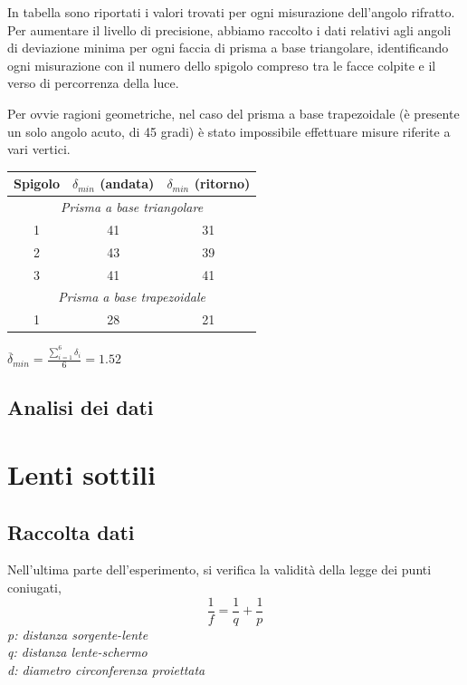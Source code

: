 \documentclass[a4paper,10pt]{report}
\begin{document}
In tabella sono riportati i valori trovati per ogni misurazione dell'angolo rifratto. Per aumentare il livello di precisione, abbiamo raccolto i dati relativi agli angoli di deviazione minima per ogni faccia di prisma a base triangolare, identificando ogni misurazione con il numero dello spigolo compreso tra le facce colpite e il verso di percorrenza della luce.

Per ovvie ragioni geometriche, nel caso del prisma a base trapezoidale (è presente un solo angolo acuto, di 45 gradi) è stato impossibile effettuare misure riferite a vari vertici.

\begin{table}
\center
\renewcommand{\arraystretch}{1.2}
\begin{tabular}{|c | c | c|}
\hline
Spigolo & $\delta_{min}$ (andata) & $\delta_{min}$ (ritorno)\\
\hline
\multicolumn{3}{|c|}{\textit{Prisma a base triangolare}} \\
\hline
1 & 41 & 31\\
2 & 43 & 39\\
3 & 41 & 41\\
\hline
\multicolumn{3}{|c|}{\textit{Prisma a base trapezoidale}} \\
\hline
1 & 28 & 21\\
\hline
\end{tabular}
\end{table}

$\overline{\delta}_{min} = \frac{\displaystyle\sum\limits_{i=1}^6 \delta_i}{6} = 1.52$

\subsection{Analisi dei dati}

\section{Lenti sottili}
\subsection{Raccolta dati}
Nell'ultima parte dell'esperimento, si verifica la validità della legge dei punti coniugati,
$$ \frac{1}{f} = \frac{1}{q} + \frac{1}{p} $$
\textit{p: distanza sorgente-lente\\
q: distanza lente-schermo\\
d: diametro circonferenza proiettata}\\
\end{document}
